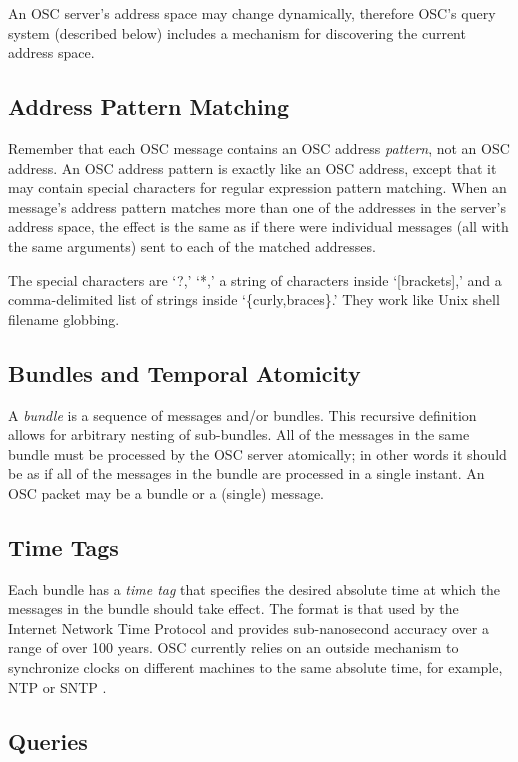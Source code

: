 An OSC server's address space may change dynamically, therefore OSC's query
system (described below) includes a mechanism for discovering the current address
space.

\subsection{Address Pattern Matching}

Remember that each OSC message contains an OSC address \textit{pattern}, not an
OSC address.  An OSC address pattern is exactly like an OSC address, except that
it may contain special characters for regular expression \cite{Friedl:1997} pattern matching. 
When an message's address pattern matches more than one of the addresses in the
server's address space, the effect is the same as if there were individual
messages (all with the same arguments) sent to each of the matched addresses.

The special characters are `?,' `*,' a string of characters inside `[brackets],'
and a comma-delimited list of strings inside `\{curly,braces\}.'  They work like
Unix shell filename globbing.

\subsection{Bundles and Temporal Atomicity}

A \textit{bundle} is a sequence of messages and/or bundles.  This recursive
definition allows for arbitrary nesting of sub-bundles.  All of the messages in
the same bundle must be processed by the OSC server atomically; in other words it
should be as if all of the messages in the bundle are processed in a single
instant.  An OSC packet may be a bundle or a (single) message.

\subsection{Time Tags}

Each bundle has a \textit{time tag }that specifies the desired absolute time at
which the messages in the bundle should take effect.  The format is that used by
the Internet Network Time Protocol \cite{Mills:1992} and provides sub-nanosecond accuracy over
a range of over 100 years.  OSC currently relies on an outside mechanism to
synchronize clocks on different machines to the same absolute time, for example,
NTP \cite{Mills:1992} or SNTP \cite{Mills:1996}.

\subsection{Queries}

